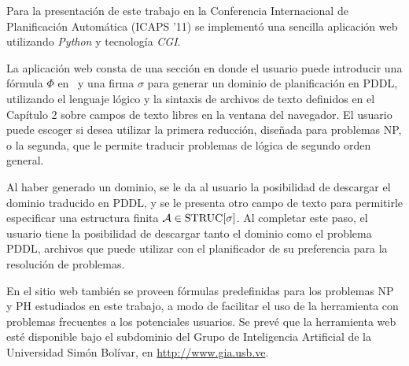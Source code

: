 Para la presentación de este trabajo en la Conferencia Internacional de
Planificación Automática (ICAPS '11) se implementó una sencilla aplicación web
utilizando \textit{Python} y tecnología \textit{CGI}.

La aplicación web consta de una sección en donde el usuario puede introducir
una fórmula $\Phi$ en \LSO\ y una firma $\sigma$ para generar un dominio de
planificación en PDDL, utilizando el lenguaje lógico y la
sintaxis de archivos de texto definidos en el Capítulo 2 sobre campos de texto
libres en la ventana del navegador.
El usuario puede escoger si desea utilizar la primera reducción, diseñada para
problemas NP, o la segunda, que le permite traducir problemas de lógica de
segundo orden general.

Al haber generado un dominio, se le da al usuario la posibilidad de descargar
el dominio traducido en PDDL, y se le presenta otro campo de texto para
permitirle especificar una estructura finita $\mathcal{A} \in \text{STRUC}[\sigma]$.
Al completar este paso, el usuario tiene la posibilidad de descargar tanto el
dominio como el problema PDDL, archivos que puede utilizar con el planificador
de su preferencia para la resolución de problemas.

En el sitio web también se proveen fórmulas predefinidas para los problemas NP
y PH estudiados en este trabajo, a modo de facilitar el uso de la herramienta
con problemas frecuentes a los potenciales usuarios. Se prevé que la
herramienta web esté disponible bajo el subdominio del Grupo de Inteligencia
Artificial de la Universidad Simón Bolívar, en \url{http://www.gia.usb.ve}.
